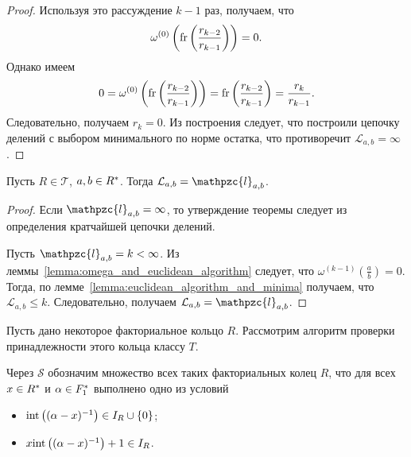 \documentclass[_00_dissertation.tex]{subfiles}
\begin{document}
\begin{proof}
    Используя это рассуждение $k-1$ раз, получаем, что
    \begin{equation*}
        \omega^{(0)}\left(
            \textrm{fr}\left(\frac{r_{k-2}}{r_{k-1}}\right)
        \right) = 0.
    \end{equation*}
    Однако имеем
    \begin{equation*}
        0 = \omega^{(0)}\left(
            \textrm{fr}\left(\frac{r_{k-2}}{r_{k-1}}\right)
        \right) = \textrm{fr}\left(\frac{r_{k-2}}{r_{k-1}}\right) = \frac{r_{k}}{r_{k-1}}.
    \end{equation*}
    Следовательно, получаем $r_k = 0$.
    Из построения следует, что построили цепочку делений с выбором минимального по норме остатка, что противоречит $\mathcal{L}_{a, b} = \infty$.
\end{proof}

\begin{theorem}\label{theorem:Kroneker_Vahlen_theorem_in_UFD}
    Пусть $R \in \mathcal{T}$, $a, b \in R^{*}$.
    Тогда $\mathcal{L}_{a, b} = \mathpzc{l}_{a, b}$.
\end{theorem}
\begin{proof}
    Если $\mathpzc{l}_{a, b} = \infty$, то утверждение теоремы следует из определения кратчайшей цепочки делений.

    Пусть $\mathpzc{l}_{a, b} = k < \infty$.
    Из леммы~\ref{lemma:omega_and_euclidean_algorithm} следует, что $\omega^{(k-1)}\left(\frac{a}{b}\right) = 0$.
    Тогда, по лемме~\ref{lemma:euclidean_algorithm_and_minima} получаем, что $\mathcal{L}_{a, b} \le k$.
    Следовательно, получаем $\mathcal{L}_{a, b} = \mathpzc{l}_{a, b}$.
\end{proof}


Пусть дано некоторое факториальное кольцо $R$.
Рассмотрим алгоритм проверки принадлежности этого кольца классу $T$.

\begin{definition}
    Через $\mathcal{S}$ обозначим множество всех таких факториальных колец $R$, что для всех $x \in R^{*}$ и $\alpha \in F_1^{*}$ выполнено одно из условий
    \begin{itemize}
        \item $\textrm{int}\left((\alpha - x)^{-1}\right) \in I_{R} \cup \{0\}$;
        
        \item $x \textrm{int}\left((\alpha - x)^{-1}\right) + 1 \in I_{R}$.
    \end{itemize}
\end{definition}
\end{document}
